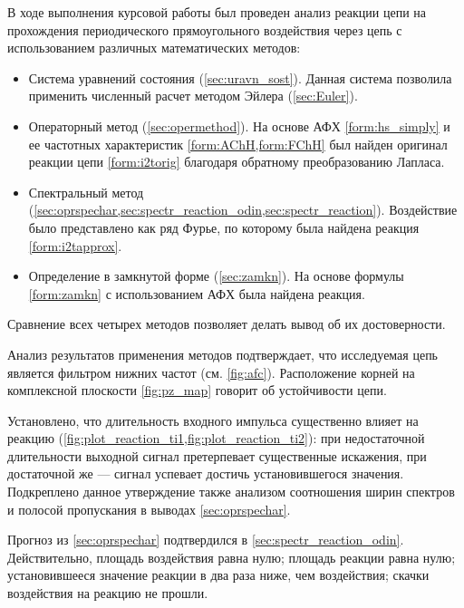 В ходе выполнения курсовой работы был проведен анализ реакции цепи на прохождения периодического прямоугольного воздействия через цепь с использованием различных математических методов:
\begin{itemize}
    \item Система уравнений состояния (\cref{sec:uravn_sost}). Данная система позволила применить численный расчет методом Эйлера (\cref{sec:Euler}).
    \item Операторный метод (\cref{sec:opermethod}). На основе АФХ \cref{form:hs_simply} и ее частотных характеристик \cref{form:AChH,form:FChH} был найден оригинал реакции цепи \cref{form:i2torig} благодаря обратному преобразованию Лапласа.
    \item Спектральный метод (\cref{sec:oprspechar,sec:spectr_reaction_odin,sec:spectr_reaction}). Воздействие было представлено как ряд Фурье, по которому была найдена реакция \cref{form:i2tapprox}.
    \item Определение в замкнутой форме (\cref{sec:zamkn}). На основе формулы \cref{form:zamkn} с использованием АФХ была найдена реакция.
\end{itemize}

Сравнение всех четырех методов позволяет делать вывод об их достоверности. 

Анализ результатов применения методов подтверждает, что исследуемая цепь является фильтром нижних частот (см. \cref{fig:afc}). Расположение корней на комплексной плоскости \cref{fig:pz_map} говорит об устойчивости цепи. 

Установлено, что длительность входного импульса существенно влияет на реакцию (\cref{fig:plot_reaction_ti1,fig:plot_reaction_ti2}): при недостаточной длительности выходной сигнал претерпевает существенные искажения, при достаточной же --- сигнал успевает достичь установившегося значения.
Подкреплено данное утверждение также анализом соотношения ширин спектров и полосой пропускания в выводах \cref{sec:oprspechar}.

Прогноз из \cref{sec:oprspechar} подтвердился в \cref{sec:spectr_reaction_odin}. Действительно, площадь воздействия равна нулю; площадь реакции равна нулю; установившееся значение реакции в два раза ниже, чем воздействия; скачки воздействия на реакцию не прошли.